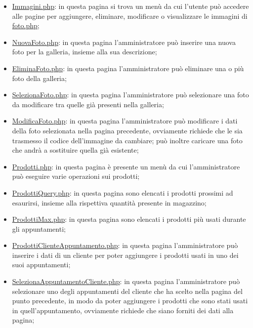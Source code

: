 {\begin{itemize}
		\item \href{http://tecweb2016.studenti.math.unipd.it/smarches/Immagini.php}{Immagini.php}: in questa pagina si trova un menù da cui l'utente può accedere alle pagine per aggiungere, eliminare, modificare o visualizzare le immagini di \href{http://tecweb2016.studenti.math.unipd.it/smarches/foto.php}{foto.php};
		\item \href{http://tecweb2016.studenti.math.unipd.it/smarches/NuovaFoto.php}{NuovaFoto.php}: in questa pagina l'amministratore può inserire una nuova foto per la galleria, insieme alla sua descrizione;
		\item \href{http://tecweb2016.studenti.math.unipd.it/smarches/EliminaFoto.php}{EliminaFoto.php}: in questa pagina l'amministratore può eliminare una o più foto della galleria;
		\item \href{http://tecweb2016.studenti.math.unipd.it/smarches/SelezionaFoto.php}{SelezionaFoto.php}: in questa pagina l'amministratore può selezionare una foto da modificare tra quelle già presenti nella galleria;
		\item \underline{ModificaFoto.php}: in questa pagina l'amministratore può modificare i dati della foto selezionata nella pagina precedente, ovviamente richiede che le sia trasmesso il codice dell'immagine da cambiare; può inoltre caricare una foto che andrà a sostituire quella già esistente;
		\item \href{http://tecweb2016.studenti.math.unipd.it/smarches/Prodotti.php}{Prodotti.php}: in questa pagina è presente un menù da cui l'amministratore può eseguire varie operazioni sui prodotti;
		\item \href{http://tecweb2016.studenti.math.unipd.it/smarches/ProdottiQuery.php}{ProdottiQuery.php}: in questa pagina sono elencati i prodotti prossimi ad esaurirsi, insieme alla rispettiva quantità presente in magazzino;
		\item \href{http://tecweb2016.studenti.math.unipd.it/smarches/ProdottiMax.php}{ProdottiMax.php}: in questa pagina sono elencati i prodotti più usati durante gli appuntamenti;
		\item \href{http://tecweb2016.studenti.math.unipd.it/smarches/ProdottiClienteAppuntamento.php}{ProdottiClienteAppuntamento.php}: in questa pagina l'amministratore può inserire i dati di un cliente per poter aggiungere i prodotti usati in uno dei suoi appuntamenti;
		\item \underline{SelezionaAppuntamentoCliente.php}: in questa pagina l'amministratore può selezionare uno degli appuntamenti del cliente che ha scelto nella pagina del punto precedente, in modo da poter aggiungere i prodotti che sono stati usati in quell'appuntamento, ovviamente richiede che siano forniti dei dati alla pagina;

\end{itemize}}
